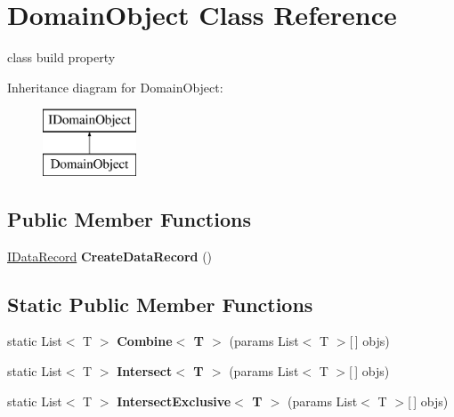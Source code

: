 \hypertarget{class_domain_object}{\section{Domain\-Object Class Reference}
\label{class_domain_object}
}


class build property  


Inheritance diagram for Domain\-Object\-:\begin{figure}[H]
\begin{center}
\leavevmode
\includegraphics[height=2.000000cm]{class_domain_object}
\end{center}
\end{figure}
\subsection*{Public Member Functions}
\begin{DoxyCompactItemize}
\item 
\hypertarget{class_domain_object_aa2dfafd14a121be434d819465a22fc64}{\hyperlink{interface_i_data_record}{I\-Data\-Record} {\bfseries Create\-Data\-Record} ()}\label{class_domain_object_aa2dfafd14a121be434d819465a22fc64}

\end{DoxyCompactItemize}
\subsection*{Static Public Member Functions}
\begin{DoxyCompactItemize}
\item 
\hypertarget{class_domain_object_aa2e87aa051fb685f3baa5762afb6aa39}{static List$<$ T $>$ {\bfseries Combine$<$ T $>$} (params List$<$ T $>$\mbox{[}$\,$\mbox{]} objs)}\label{class_domain_object_aa2e87aa051fb685f3baa5762afb6aa39}

\item 
\hypertarget{class_domain_object_a62a97aee13e01adae000f6f8a09d8d5b}{static List$<$ T $>$ {\bfseries Intersect$<$ T $>$} (params List$<$ T $>$\mbox{[}$\,$\mbox{]} objs)}\label{class_domain_object_a62a97aee13e01adae000f6f8a09d8d5b}

\item 
\hypertarget{class_domain_object_ac3a86d7b35e19a67ff71c3817cd62765}{static List$<$ T $>$ {\bfseries Intersect\-Exclusive$<$ T $>$} (params List$<$ T $>$\mbox{[}$\,$\mbox{]} objs)}\label{class_domain_object_ac3a86d7b35e19a67ff71c3817cd62765}

\end{DoxyCompactItemize}
